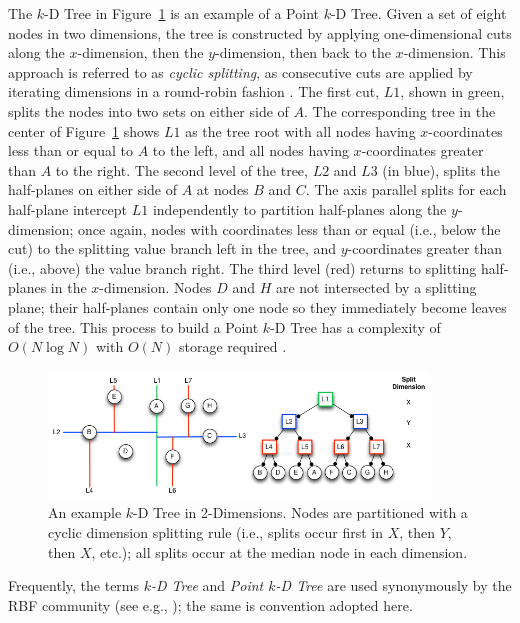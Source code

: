 \documentclass{report}
\begin{document}
The $k$-D Tree in Figure~\ref{fig:kdtree_example} is an example of a Point $k$-D Tree. Given a set of eight nodes in two dimensions, the tree is constructed by applying one-dimensional cuts along the $x$-dimension, then the $y$-dimension, then back to the $x$-dimension. This approach is referred to as \emph{cyclic splitting}, as consecutive cuts are applied by iterating dimensions in a round-robin fashion \cite{Samet2005}. The first cut, $L1$, shown in green, splits the nodes into two sets on either side of $A$. The corresponding tree in the center of Figure~\ref{fig:kdtree_example} shows $L1$ as the tree root with all nodes having $x$-coordinates less than or equal to $A$ to the left, and all nodes having $x$-coordinates greater than $A$ to the right. The second level of the tree, $L2$ and $L3$ (in blue), splits the half-planes on either side of $A$ at nodes $B$ and $C$. The axis parallel splits for each half-plane intercept $L1$ independently to partition half-planes along the $y$-dimension; once again, nodes with coordinates less than or equal (i.e., below the cut) to the splitting value branch left in the tree, and $y$-coordinates greater than  (i.e., above) the value branch right. The third level (red) returns to splitting half-planes in the $x$-dimension. Nodes $D$ and $H$ are not intersected by a splitting plane; their half-planes contain only one node so they immediately become leaves of the tree. This process to build a Point $k$-D Tree has a complexity of $O(N \log N)$ with $O(N)$ storage required \cite{Berg2008,Samet2005}.

\begin{figure}
\centering
\includegraphics[width=0.9\textwidth]{rbffd_methods_content/neighbors/kdTree_example.png}
\caption{An example $k$-D Tree in 2-Dimensions. Nodes are partitioned with a cyclic dimension splitting rule (i.e., splits occur first in $X$, then $Y$, then $X$, etc.); all splits occur at the median node in each dimension. }
\label{fig:kdtree_example}
\end{figure}

Frequently, the terms \emph{$k$-D Tree} and \emph{Point $k$-D Tree} are used synonymously by the RBF community (see e.g., \cite{Fasshauer2007,FlyerLehto11,FornbergLehto11}); the same is convention adopted here. 
\end{document}

